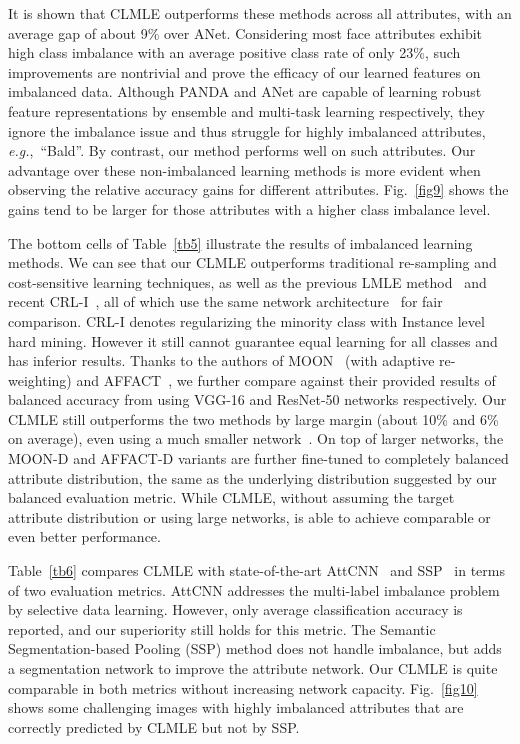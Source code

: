 \documentclass[10pt,journal,compsoc]{IEEEtran}
\newcommand{\eg}{\emph{e.g.}}
\begin{document}
It is shown that CLMLE outperforms these methods across all attributes, with an average gap of about 9\% over ANet. Considering most face attributes exhibit high class imbalance with an average positive class rate of only 23\%, such improvements are nontrivial and prove the efficacy of our learned features on imbalanced data. Although PANDA and ANet are capable of learning robust feature representations by ensemble and multi-task learning respectively, they ignore the imbalance issue and thus struggle for highly imbalanced attributes, \eg,~``Bald''. By contrast, our method performs well on such attributes. Our advantage over these non-imbalanced learning methods is more evident when observing the relative accuracy gains for different attributes. Fig.~\ref{fig9} shows the gains tend to be larger for those attributes with a higher class imbalance level.

The bottom cells of Table~\ref{tb5} illustrate the results of imbalanced learning methods. We can see that our CLMLE outperforms traditional re-sampling and cost-sensitive learning techniques, as well as the previous LMLE method~\cite{huang2016lmle} and recent CRL-I~\cite{Dong_2017_ICCV}, all of which use the same network architecture~\cite{Yi14} for fair comparison. CRL-I denotes regularizing the minority class with Instance level hard mining. However it still cannot guarantee equal learning for all classes and has inferior results. Thanks to the authors of MOON~\cite{Rudd2016} (with adaptive re-weighting) and AFFACT~\cite{guenther2017affact}, we further compare against their provided results of balanced accuracy from using VGG-16 and ResNet-50 networks respectively. Our CLMLE still outperforms the two methods by large margin (about 10\% and 6\% on average), even using a much smaller network~\cite{Yi14}. On top of larger networks, the MOON-D and AFFACT-D variants are further fine-tuned to completely balanced attribute distribution, the same as the underlying distribution suggested by our balanced evaluation metric. While CLMLE, without assuming the target attribute distribution or using large networks, is able to achieve comparable or even better performance.

Table~\ref{tb6} compares CLMLE with state-of-the-art AttCNN~\cite{AAAI1816962} and SSP~\cite{Kalayeh17} in terms of two evaluation metrics. AttCNN addresses the multi-label imbalance problem by selective data learning. However, only average classification accuracy is reported, and our superiority still holds for this metric. The Semantic Segmentation-based Pooling (SSP) method does not handle imbalance, but adds a segmentation network to improve the attribute network. Our CLMLE is quite comparable in both metrics without increasing network capacity. Fig.~\ref{fig10} shows some challenging images with highly imbalanced attributes that are correctly predicted by CLMLE but not by SSP.
\end{document}
